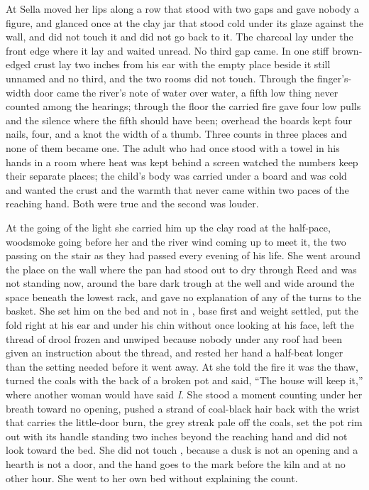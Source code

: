 At  Sella moved her lips along a row that stood with two gaps and gave nobody a figure, and glanced once at the clay jar that stood cold under its glaze against the wall, and did not touch it and did not go back to it. The charcoal lay under the front edge where it lay and waited unread. No third gap came. In  one stiff brown-edged crust lay two inches from his ear with the empty place beside it still unnamed and no third, and the two rooms did not touch. Through the finger's-width door came the river's note of water over water, a fifth low thing never counted among the hearings; through the floor the carried fire gave four low pulls and the silence where the fifth should have been; overhead the boards kept four nails, four, and a knot the width of a thumb. Three counts in three places and none of them became one. The adult who had once stood with a towel in his hands in a room where heat was kept behind a screen watched the numbers keep their separate places; the child's body was carried under a board and was cold and wanted the crust and the warmth that never came within two paces of the reaching hand. Both were true and the second was louder.

At the going of the light she carried him up the clay road at the half-pace, woodsmoke going before her and the river wind coming up to meet it, the two passing on the stair as they had passed every evening of his life. She went around the place on the wall where the pan had stood out to dry through Reed and was not standing now, around the bare dark trough at the well and wide around the space beneath the lowest rack, and gave no explanation of any of the turns to the basket. She set him on the bed and not in , base first and weight settled, put the fold right at his ear and under his chin without once looking at his face, left the thread of drool frozen and unwiped because nobody under any roof had been given an instruction about the thread, and rested her hand a half-beat longer than the setting needed before it went away. At  she told the fire it was the thaw, turned the coals with the back of a broken pot and said, “The house will keep it,” where another woman would have said \emph{I}. She stood a moment counting under her breath toward no opening, pushed a strand of coal-black hair back with the wrist that carries the little-door burn, the grey streak pale off the coals, set the pot rim out with its handle standing two inches beyond the reaching hand and did not look toward the bed. She did not touch , because a dusk is not an opening and a hearth is not a door, and the hand goes to the mark before the kiln and at no other hour. She went to her own bed without explaining the count.


